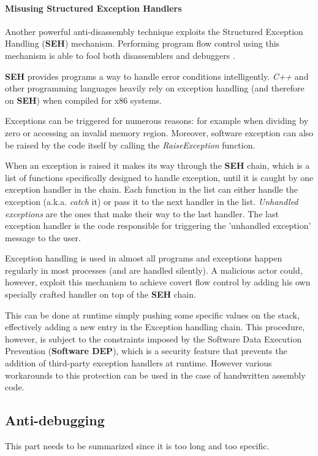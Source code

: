 \documentclass[pdfa%
,cucitura%
]{toptesi}
\begin{document}
\paragraph{Misusing Structured Exception Handlers}\label{MisusingStructuredExceptionHandlers}
Another powerful anti-disassembly technique exploits the Structured Exception Handling (\textbf{SEH}) mechanism. Performing program flow control using this mechanism is able to fool both disassemblers and debuggers \cite{SikorskiPMA}.

\textbf{SEH} provides programs a way to handle error conditions intelligently. \textit{C++} and other programming languages heavily rely on exception handling (and therefore on \textbf{SEH}) when compiled for x86 systems.

Exceptions can be triggered for numerous reasons: for example when dividing by zero or accessing an invalid memory region. Moreover, software exception can also be raised by the code itself by calling the \textit{RaiseException} function.

When an exception is raised it makes its way through the \textbf{SEH} chain, which is a list of functions specifically designed to handle exception, until it is caught by one exception handler in the chain. Each function in the list can either handle the exception (a.k.a. \textit{catch} it) or pass it to the next handler in the list. \textit{Unhandled exceptions} are the ones that make their way to the last handler. The last exception handler is the code responsible for triggering the 'unhandled exception' message to the user. 

Exception handling is used in almost all programs and exceptions happen regularly in most processes (and are handled silently). A malicious actor could, however, exploit this mechanism to achieve covert flow control by adding his own specially crafted handler on top of the \textbf{SEH} chain.

This can be done at runtime simply pushing some specific values on the stack, effectively adding a new entry in the Exception handling chain. This procedure, however, is subject to the constraints imposed by the Software Data Execution Prevention (\textbf{Software DEP}), which is a security feature that prevents the addition of third-party exception handlers at runtime. However various workarounds to this protection can be used in the case of handwritten assembly code.

\subsection{Anti-debugging}
\color{Green}
This part needs to be summarized since it is too long and too specific.
\color{Black}
\end{document}
